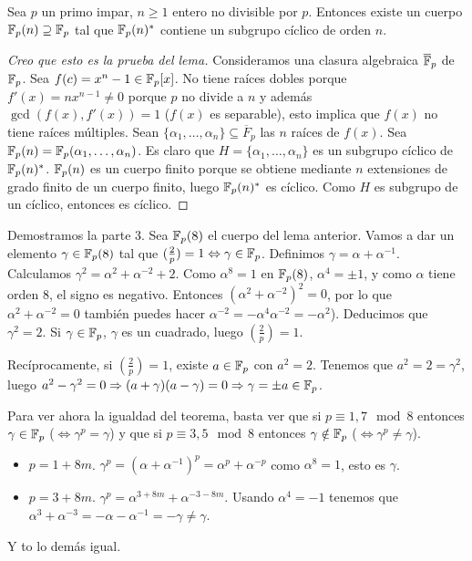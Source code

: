 \documentclass[CR.tex]{subfiles}
\begin{document}
\begin{dem}

\begin{lemma}
Sea $p$ un primo impar, $n\geq 1$ entero no divisible por $p$. Entonces existe un cuerpo $\mathbb{F}_p(n)\supseteq \mathbb{F}_p$ tal que $\mathbb{F}_p(n)^*$ contiene un subgrupo cíclico de orden $n$. 
\end{lemma}
\begin{proof}[Creo que esto es la prueba del lema]
Consideramos una clasura algebraica $\overline{\mathbb{F}}_p$ de $\mathbb{F}_p$. Sea $f(c)=x^n-1\in\mathbb{F}_p[x]$. No tiene raíces dobles porque $f'(x)=nx^{n-1}\neq 0$ porque $p$ no divide a $n$ y además $\gcd(f(x),f'(x))=1$ ($f(x)$ es separable), esto implica que $f(x)$ no tiene raíces múltiples. Sean $\{\alpha_1,\dots,\alpha_n\}\subseteq\overline{F}_p$ las $n$ raíces de $f(x)$. Sea $\mathbb{F}_p(n)=\mathbb{F}_p(\alpha_1,\dots, \alpha_n)$. Es claro que $H=\{\alpha_1,\dots,\alpha_n\}$ es un subgrupo cíclico de $\mathbb{F}_p(n)^*$. $\mathbb{F}_p(n)$ es un cuerpo finito porque se obtiene mediante $n$ extensiones de grado finito de un cuerpo finito, luego $\mathbb{F}_p(n)^*$ es cíclico.  Como $H$ es subgrupo de un cíclico, entonces es cíclico.
\end{proof}

Demostramos la parte 3. Sea $\mathbb{F}_p(8)$ el cuerpo del lema anterior. Vamos a dar un elemento $\gamma\in\mathbb{F}_p(8)$ tal que $(\frac{2}{p})=1\Leftrightarrow \gamma\in\mathbb{F}_p$. Definimos $\gamma=\alpha+\alpha^{-1}$. Calculamos $\gamma^2=\alpha^2+\alpha^{-2}+2$. Como $\alpha^8=1$ en $\mathbb{F}_p(8)$, $\alpha^4=\pm 1$, y como $\alpha$ tiene orden 8, el signo es negativo. Entonces $(\alpha^2+\alpha^{-2})^2=0$, por lo que $\alpha^2+\alpha^{-2}=0$ también puedes hacer $\alpha^{-2}=-\alpha^4\alpha^{-2}=-\alpha^2$). Deducimos que $\gamma^2=2$. Si $\gamma\in\mathbb{F}_p$, $\gamma$ es un cuadrado, luego $(\frac{2}{p})=1$. 

Recíprocamente, si $(\frac{2}{p})=1$, existe $a\in\mathbb{F}_p$ con $a^2=2$. Tenemos que $a^2=2=\gamma^2$, luego $a^2-\gamma^2=0\Rightarrow (a+\gamma)(a-\gamma)=0\Rightarrow \gamma=\pm a\in\mathbb{F}_p$. 

Para ver ahora la igualdad del teorema, basta ver que si $p\equiv 1,7\mod 8$ entonces $\gamma\in\mathbb{F}_p$ ($\Leftrightarrow\gamma^p=\gamma$) y que si $p\equiv 3,5\mod 8$ entonces $\gamma\notin\mathbb{F}_p$ ($\Leftrightarrow \gamma^p\neq \gamma$).

\begin{itemize}
\item $p=1+8m$. $\gamma^p=(\alpha+\alpha^{-1})^p=\alpha^p+\alpha^{-p}$ como $\alpha^8=1$, esto es $\gamma$. 
\item $p=3+8m$. $\gamma^p=\alpha^{3+8m}+\alpha^{-3-8m}$. Usando $\alpha^4=-1$ tenemos que $\alpha^3+\alpha^{-3}=-\alpha-\alpha^{-1}=-\gamma\neq\gamma$.
\end{itemize}
Y to lo demás igual.



\end{dem}
\end{document}
